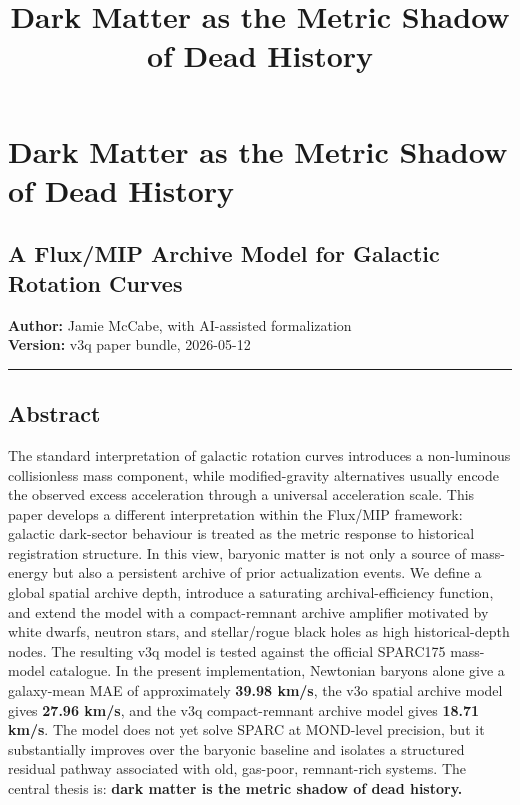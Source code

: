 \documentclass[
]{article}
\title{Dark Matter as the Metric Shadow of Dead History}
\author{}
\date{}
\begin{document}
\maketitle

{
\setcounter{tocdepth}{3}
\tableofcontents
}
\section{Dark Matter as the Metric Shadow of Dead
History}\label{dark-matter-as-the-metric-shadow-of-dead-history}

\subsection{A Flux/MIP Archive Model for Galactic Rotation
Curves}\label{a-fluxmip-archive-model-for-galactic-rotation-curves}

\textbf{Author:} Jamie McCabe, with AI-assisted formalization\\
\textbf{Version:} v3q paper bundle, 2026-05-12

\begin{center}\rule{0.5\linewidth}{0.5pt}\end{center}

\subsection{Abstract}\label{abstract}

The standard interpretation of galactic rotation curves introduces a
non-luminous collisionless mass component, while modified-gravity
alternatives usually encode the observed excess acceleration through a
universal acceleration scale. This paper develops a different
interpretation within the Flux/MIP framework: galactic dark-sector
behaviour is treated as the metric response to historical registration
structure. In this view, baryonic matter is not only a source of
mass-energy but also a persistent archive of prior actualization events.
We define a global spatial archive depth, introduce a saturating
archival-efficiency function, and extend the model with a
compact-remnant archive amplifier motivated by white dwarfs, neutron
stars, and stellar/rogue black holes as high historical-depth nodes. The
resulting v3q model is tested against the official SPARC175 mass-model
catalogue. In the present implementation, Newtonian baryons alone give a
galaxy-mean MAE of approximately \textbf{39.98 km/s}, the v3o spatial
archive model gives \textbf{27.96 km/s}, and the v3q compact-remnant
archive model gives \textbf{18.71 km/s}. The model does not yet solve
SPARC at MOND-level precision, but it substantially improves over the
baryonic baseline and isolates a structured residual pathway associated
with old, gas-poor, remnant-rich systems. The central thesis is:
\textbf{dark matter is the metric shadow of dead history.}
\end{document}
